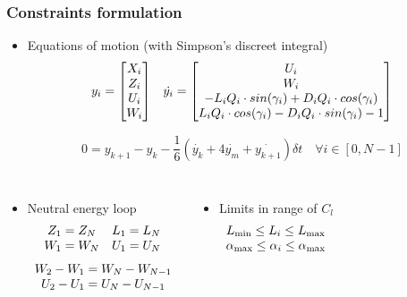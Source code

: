 \documentclass[compress]{beamer}
\begin{document}
\begin{frame}
  \frametitle{Constraints formulation}
  \begin{itemize}
    \item Equations of motion (with Simpson's discreet integral)
      \begin{equation*}
	\begin{array}[c]{cc}
	  y_i= \begin{bmatrix}
	    X_i \\
	    Z_i \\
	    U_i \\
	    W_i 
	  \end{bmatrix} &

	  \dot{y_i} = 
	  \begin{bmatrix}
	    U_i \\
	    W_i \\
	    -L_i Q_i \cdot sin(\gamma_i) + D_i Q_i \cdot cos(\gamma_i) \\
	    L_i Q_i  \cdot cos(\gamma_i ) - D_i Q_i  \cdot sin(\gamma_i ) - 1
	  \end{bmatrix}
	\end{array}
      \end{equation*}

      \begin{equation*}
	0=y_{k+1} - y_k - \frac{1}{6}( \dot{y_k} + 4 \dot{y_m} + \dot{y_{k+1}})\delta t \quad \forall i \in [0,N-1]
      \end{equation*}
  \end{itemize}

  \begin{columns}[t]
    \begin{itemize}
      \item Neutral energy loop
	\begin{equation*}
	  \begin{array}[c]{cc}
	    Z_1 = Z_N & L_1 = L_N \\
	    W_1 = W_N & U_1 = U_N
	  \end{array}
	\end{equation*}
	\begin{equation*}
	  \begin{array}[c]{c}
	    W_2 - W_1 = W_N - W_{N-1} \\
	    U_2 - U_1 = U_N - U_{N-1} 
	  \end{array}
	\end{equation*}
    \end{itemize}
    \begin{itemize}
      \item Limits in range of $C_l$
	\begin{equation*}
	  \begin{array}[c]{c}
	    L_{\min} \le L_i \le L_{\max} \\
	    \alpha_{\max} \le \alpha_i \le \alpha_{\max}
	  \end{array}
	\end{equation*}
    \end{itemize}
  \end{columns}
\end{frame}
\end{document}
